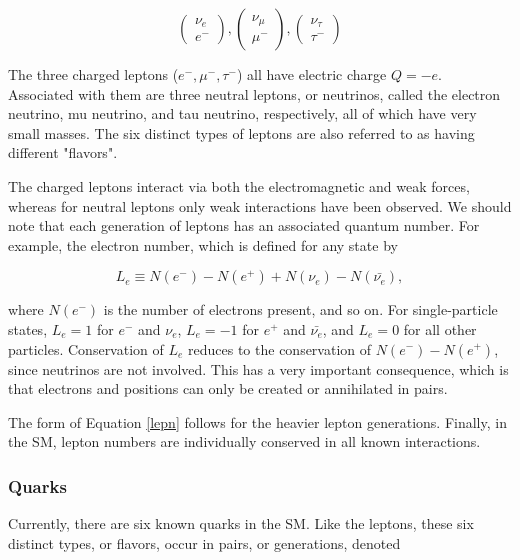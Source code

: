 \begin{equation}
	\begin{pmatrix}
		\nu_{e}\\
		e^{-}
	\end{pmatrix},
\begin{pmatrix}
		\nu_{\mu}\\
		\mu^{-}
	\end{pmatrix},
	\begin{pmatrix}
		\nu_{\tau}\\
		\tau^{-}
	\end{pmatrix}
\end{equation}

The three charged leptons ($e^{-}, \mu^{-},\tau^{-}$) all have electric charge $Q=-e$. Associated with them are three neutral leptons, or neutrinos, called the electron neutrino, mu neutrino, and tau neutrino, respectively, all of which have very small masses. The six distinct types of leptons are also referred to as having different "flavors". 

The charged leptons interact via both the electromagnetic and weak forces, whereas for neutral leptons only weak interactions have been observed. We should note that each generation of leptons has an associated quantum number. For example, the electron number, which is defined for any state by

\begin{equation}
\label{lepn}
L_{e}\equiv N(e^{-}) - N(e^{+}) + N(\nu_{e}) - N(\bar{\nu_{e}}),
\end{equation}

where $N(e^{-})$ is the number of electrons present, and so on. For single-particle states, $L_{e} = 1$ for $e^{-}$ and $\nu_{e}$, $L_{e}=-1$ for $e^{+}$ and $\bar{\nu_{e}}$, and $L_{e}=0$ for all other particles. Conservation of $L_{e}$ reduces to the conservation of $N(e^{-}) - N(e^{+})$, since neutrinos are not involved. This has a very important consequence, which is that electrons and positions can only be created or annihilated in pairs.

The form of Equation \ref{lepn} follows for the heavier lepton generations. Finally, in the SM, lepton numbers are individually conserved in all known interactions.

\subsubsection{Quarks}
Currently, there are six known quarks in the SM. Like the leptons, these six distinct types, or flavors, occur in pairs, or generations, denoted

